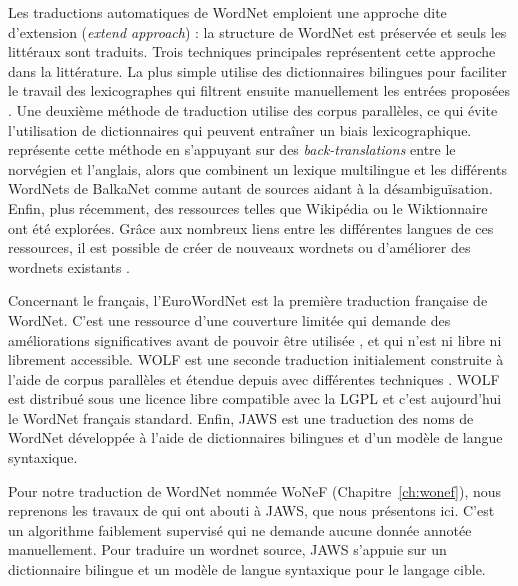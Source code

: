 Les traductions automatiques de WordNet emploient une approche dite d'extension
(\textit{extend approach}) : la structure de WordNet est préservée et seuls les
littéraux sont traduits. Trois techniques principales représentent cette
approche dans la littérature. La plus simple utilise des dictionnaires
bilingues pour faciliter le travail des lexicographes qui filtrent ensuite
manuellement les entrées proposées
\citep{vossen1998eurowordnet,pianta2002developing,tufis2004balkanet}. Une
deuxième méthode de traduction utilise des corpus parallèles, ce qui évite
l'utilisation de dictionnaires qui peuvent entraîner un biais lexicographique.
\cite{dyvik2004translations} représente cette méthode en s'appuyant sur des
\textit{back-translations} entre le norvégien et l'anglais, alors que
\citep{sagot2008construction} combinent un lexique multilingue et les
différents WordNets de BalkaNet comme autant de sources aidant à la
désambiguïsation. Enfin, plus récemment, des ressources telles que Wikipédia ou
le Wiktionnaire ont été explorées. Grâce aux nombreux liens entre les
différentes langues de ces ressources, il est possible de créer de nouveaux
wordnets \citep{demelo2009towards,navigli2010babelnet} ou d'améliorer des
wordnets existants \citep{hanoka2012wordnet}.

Concernant le français, l'EuroWordNet \citep{vossen1998eurowordnet} est la
première traduction française de WordNet. C'est une ressource d'une couverture
limitée qui demande des améliorations significatives avant de pouvoir être
utilisée \citep{jacquin2006systemes}, et qui n'est ni libre ni librement
accessible. WOLF est une seconde traduction initialement construite à l'aide de
corpus parallèles \citep{sagot2008construction} et étendue depuis avec
différentes techniques \citep{apidianaki2012applying}. WOLF est distribué sous
une licence libre compatible avec la LGPL et c'est aujourd'hui le WordNet
français standard. Enfin, JAWS \citep{mouton2010jaws} est une traduction des
noms de WordNet développée à l'aide de dictionnaires bilingues et d'un modèle
de langue syntaxique.

\label{subsec:jaws_translation_process}

Pour notre traduction de WordNet nommée WoNeF (Chapitre~\ref{ch:wonef}), nous
reprenons les travaux de \cite{mouton2010jaws} qui ont abouti à JAWS, que nous
présentons ici. C'est un algorithme faiblement supervisé qui ne demande aucune
donnée annotée manuellement. Pour traduire un wordnet source, JAWS s'appuie sur
un dictionnaire bilingue et un modèle de langue syntaxique pour le langage
cible.

